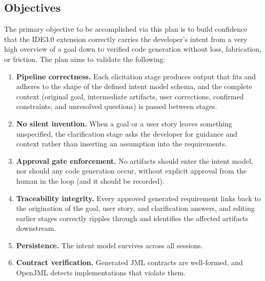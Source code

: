 \documentclass[12pt, titlepage]{article}
\begin{document}
\subsection{Objectives}




The primary objective to be accomplished via this plan is to build confidence
that the IDE3.0 extension correctly carries the developer's intent from a very
high overview of a goal down to verified code generation without loss,
fabrication, or friction. The plan aims to validate the following:

\begin{enumerate}
\item \textbf{Pipeline correctness.} Each elicitation stage produces output that fits and adheres to the shape of the defined intent model schema, and the complete context (original goal, intermediate artifacts, user corrections, confirmed constraints, and unresolved questions) is passed between stages.
\item \textbf{No silent invention.} When a goal or a user story leaves something unspecified, the clarification stage asks the developer for guidance and context rather than inserting an assumption into the requirements.
\item \textbf{Approval gate enforcement.} No artifacts should enter the intent model, nor should any code generation occur, without explicit approval from the human in the loop (and it should be recorded).
\item \textbf{Traceability integrity.} Every approved generated requirement links back to the origination of the goal, user story, and clarification answers, and editing earlier stages correctly ripples through and identifies the affected artifacts downstream.
\item \textbf{Persistence.} The intent model survives across all sessions.
\item \textbf{Contract verification.} Generated JML contracts are well-formed, and OpenJML detects implementations that violate them.
\end{enumerate}
\end{document}

